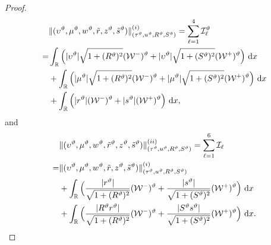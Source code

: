 \documentclass[11pt,reqno]{article}
\newcommand{\fr}{\frac}
\numberwithin{equation}{section}
\begin{document}
\begin{proof}
\begin{align}
\begin{split}
&\|(\upsilon^\vartheta, \mu^\vartheta, w^\vartheta, \tilde{r}, z^\vartheta, \tilde{s}^\vartheta)\|_{(\tau^\vartheta, u^\vartheta, R^\vartheta, S^\vartheta)}^{(i)}=\sum_{\ell=1}^4\mathcal{I}_{\ell}^\vartheta \\ =&\int_{\mathbb{R}}\Big(|\upsilon^\vartheta|\sqrt{1+(R^\vartheta)^2}(\mathcal{W}^-)^\vartheta +|\upsilon^\vartheta|\sqrt{1+(S^\vartheta)^2}(\mathcal{W}^+)^\vartheta\Big)\ {\rm d}x  \\ &+\int_{\mathbb{R}}\Big(|\mu^\vartheta|\sqrt{1+(R^\vartheta)^2}(\mathcal{W}^-)^\vartheta +|\mu^\vartheta|\sqrt{1+(S^\vartheta)^2}(\mathcal{W}^+)^\vartheta\Big)\ {\rm d}x \\ &+\int_{\mathbb{R}}\Big(|r^\vartheta|(\mathcal{W}^-)^\vartheta +|s^\vartheta|(\mathcal{W}^+)^\vartheta\Big)\ {\rm d}x,
\end{split}
\end{align}
and
\begin{align}\label{7.37}
\begin{split}
&\|(\upsilon^\vartheta, \mu^\vartheta, w^\vartheta, \tilde{r}^\vartheta, z^\vartheta, \tilde{s}^\vartheta)\|_{(\tau^\vartheta, u^\vartheta, R^\vartheta, S^\vartheta)}^{(ii)}=\sum_{\ell=1}^6\mathcal{I}_\ell \\
=& \|(\upsilon^\vartheta, \mu^\vartheta, w^\vartheta, \tilde{r}, z^\vartheta, \tilde{s}^\vartheta)\|_{(\tau^\vartheta, u^\vartheta, R^\vartheta, S^\vartheta)}^{(i)} \\ &+\int_{\mathbb{R}}\Big(\fr{|r^\vartheta|}{\sqrt{1+(R^\vartheta)^2}}(\mathcal{W}^-)^\vartheta +\fr{|s^\vartheta|}{\sqrt{1+(S^\vartheta)^2}}(\mathcal{W}^+)^\vartheta\Big)\ {\rm d}x \\ &+\int_{\mathbb{R}}\Big(\fr{|R^\vartheta r^\vartheta|}{\sqrt{1+(R^\vartheta)^2}}(\mathcal{W}^-)^\vartheta +\fr{|S^\vartheta s^\vartheta|}{\sqrt{1+(S^\vartheta)^2}}(\mathcal{W}^+)^\vartheta\Big)\ {\rm d}x.
\end{split}
\end{align}


\end{proof}
\end{document}

